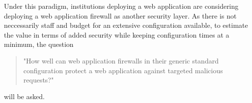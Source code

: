 Under this paradigm, institutions deploying a web application are considering deploying a web application firewall as another security layer. As there is not neccessarily staff and budget for an extensive configuration available, to estimate the value in terms of added security while keeping configuration times at a minimum, the question
\begin{quote} "How well can web application firewalls in their generic standard configuration protect a web application against targeted malicious requests?" 
\end{quote}
will be asked. \\
